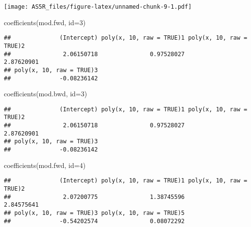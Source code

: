 \documentclass[
]{article}
\newenvironment{Shaded}{\begin{snugshade}}{\end{snugshade}}
\newcommand{\AttributeTok}[1]{\textcolor[rgb]{0.77,0.63,0.00}{#1}}
\newcommand{\DecValTok}[1]{\textcolor[rgb]{0.00,0.00,0.81}{#1}}
\newcommand{\FunctionTok}[1]{\textcolor[rgb]{0.00,0.00,0.00}{#1}}
\newcommand{\NormalTok}[1]{#1}
\newcommand{\SpecialCharTok}[1]{\textcolor[rgb]{0.00,0.00,0.00}{#1}}
\newcommand{\StringTok}[1]{\textcolor[rgb]{0.31,0.60,0.02}{#1}}
\begin{document}
\begin{Shaded}
\end{Shaded}

\texttt{[image: AS5R\_files/figure-latex/unnamed-chunk-9-1.pdf]}

\begin{Shaded}
\begin{Highlighting}[]
\FunctionTok{coefficients}\NormalTok{(mod.fwd, }\AttributeTok{id=}\DecValTok{3}\NormalTok{)}
\end{Highlighting}
\end{Shaded}

\begin{verbatim}
##              (Intercept) poly(x, 10, raw = TRUE)1 poly(x, 10, raw = TRUE)2 
##               2.06150718               0.97528027               2.87620901 
## poly(x, 10, raw = TRUE)3 
##              -0.08236142
\end{verbatim}

\begin{Shaded}
\begin{Highlighting}[]
\FunctionTok{coefficients}\NormalTok{(mod.bwd, }\AttributeTok{id=}\DecValTok{3}\NormalTok{)}
\end{Highlighting}
\end{Shaded}

\begin{verbatim}
##              (Intercept) poly(x, 10, raw = TRUE)1 poly(x, 10, raw = TRUE)2 
##               2.06150718               0.97528027               2.87620901 
## poly(x, 10, raw = TRUE)3 
##              -0.08236142
\end{verbatim}

\begin{Shaded}
\begin{Highlighting}[]
\FunctionTok{coefficients}\NormalTok{(mod.fwd, }\AttributeTok{id=}\DecValTok{4}\NormalTok{)}
\end{Highlighting}
\end{Shaded}

\begin{verbatim}
##              (Intercept) poly(x, 10, raw = TRUE)1 poly(x, 10, raw = TRUE)2 
##               2.07200775               1.38745596               2.84575641 
## poly(x, 10, raw = TRUE)3 poly(x, 10, raw = TRUE)5 
##              -0.54202574               0.08072292
\end{verbatim}
\end{document}
